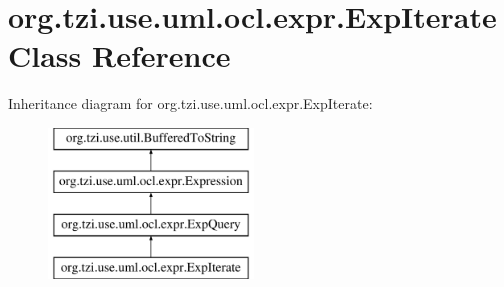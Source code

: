 \hypertarget{classorg_1_1tzi_1_1use_1_1uml_1_1ocl_1_1expr_1_1_exp_iterate}{\section{org.\-tzi.\-use.\-uml.\-ocl.\-expr.\-Exp\-Iterate Class Reference}
\label{classorg_1_1tzi_1_1use_1_1uml_1_1ocl_1_1expr_1_1_exp_iterate}
}
Inheritance diagram for org.\-tzi.\-use.\-uml.\-ocl.\-expr.\-Exp\-Iterate\-:\begin{figure}[H]
\begin{center}
\leavevmode
\includegraphics[height=4.000000cm]{classorg_1_1tzi_1_1use_1_1uml_1_1ocl_1_1expr_1_1_exp_iterate}
\end{center}
\end{figure}
